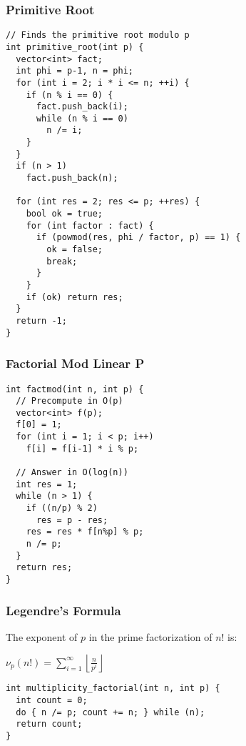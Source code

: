 \begin{center}
\begin{minipage}[t]{0.45\linewidth}
\subsubsection{Primitive Root}

\begin{lstlisting}
// Finds the primitive root modulo p
int primitive_root(int p) {
  vector<int> fact;
  int phi = p-1, n = phi;
  for (int i = 2; i * i <= n; ++i) {
    if (n % i == 0) {
      fact.push_back(i);
      while (n % i == 0)
        n /= i;
    }
  }
  if (n > 1)
    fact.push_back(n);

  for (int res = 2; res <= p; ++res) {
    bool ok = true;
    for (int factor : fact) {
      if (powmod(res, phi / factor, p) == 1) {
        ok = false;
        break;
      }
    }
    if (ok) return res;
  }
  return -1;
}
\end{lstlisting}
\end{minipage}
\qquad
\begin{minipage}[t]{0.45\linewidth}
\subsubsection{Factorial Mod Linear P}

\begin{lstlisting}
int factmod(int n, int p) {
  // Precompute in O(p)
  vector<int> f(p);
  f[0] = 1;
  for (int i = 1; i < p; i++)
    f[i] = f[i-1] * i % p;

  // Answer in O(log(n))
  int res = 1;
  while (n > 1) {
    if ((n/p) % 2)
      res = p - res;
    res = res * f[n%p] % p;
    n /= p;
  }
  return res;
}
\end{lstlisting}

\subsubsection{Legendre's Formula}

The exponent of $p$ in the prime factorization \cite{FactorialModP_CPAlgo} of $n!$ is:

\begin{center}
  $\displaystyle \nu_p(n!) = \sum_{i=1}^{\infty} \left\lfloor \frac{n}{p^i} \right\rfloor$
\end{center}

\begin{lstlisting}
int multiplicity_factorial(int n, int p) {
  int count = 0;
  do { n /= p; count += n; } while (n);
  return count;
}
\end{lstlisting}
\end{minipage}
\end{center}

